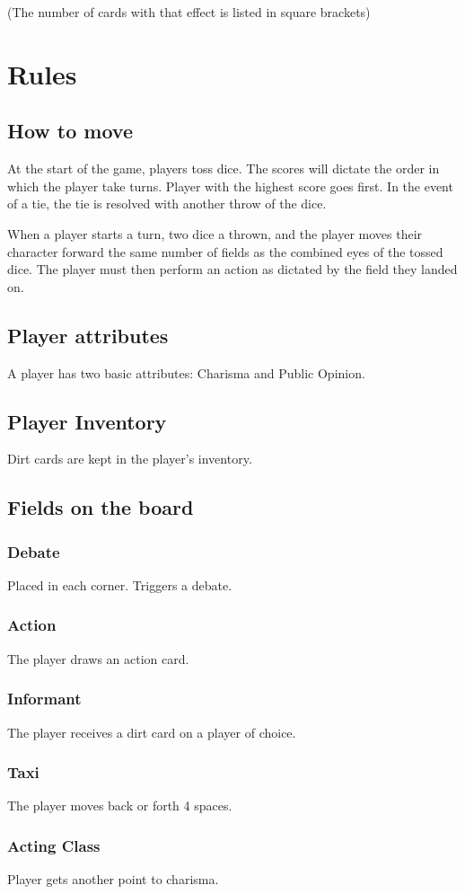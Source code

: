 \documentclass[a4paper,11pt]{amsart}
\begin{document}
(The number of cards with that effect is listed in square brackets)

\section{Rules}
\subsection{How to move}
At the start of the game, players toss dice. The scores will dictate the order in which the player take turns. Player with the highest score goes first. In the event of a tie, the tie is resolved with another throw of the dice.

When a player starts a turn, two dice a thrown, and the player moves their character forward the same number of fields as the combined eyes of the tossed dice. The player must then perform an action as dictated by the field they landed on.
\subsection{Player attributes}
A player has two basic attributes: Charisma and Public Opinion. 
\subsection{Player Inventory}
Dirt cards are kept in the player's inventory.
\subsection{Fields on the board}
\subsubsection{Debate}Placed in each corner. Triggers a debate.
\subsubsection{Action}The player draws an action card.
\subsubsection{Informant}The player receives a dirt card on a player of choice.
\subsubsection{Taxi}The player moves back or forth 4 spaces.
\subsubsection{Acting Class}Player gets another point to charisma.
\end{document}
